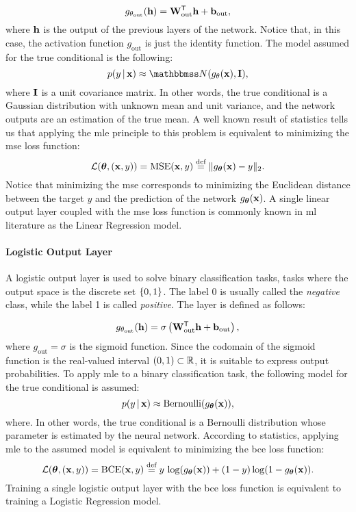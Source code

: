 $$g_{\theta_\mathrm{out}}(\Vector{h}) = \Matrix{W}_{\mathrm{out}}^{\Transpose}\Vector{h} + \Vector{b}_{\mathrm{out}},$$
where $\Vector{h}$ is the output of the previous layers of the network. Notice that, in this case, the activation function $g_{\mathrm{out}}$ is just the identity function. The model assumed for the true conditional is the following:
$$p(y \given \Vector{x}) \approx \Normal{g_{\theta}(\Vector{x})}{\Matrix{I}},$$
where $\Matrix{I}$ is a unit covariance matrix. In other words, the true conditional is a Gaussian distribution with unknown mean and unit variance, and the network outputs are an estimation of the true mean. A well known result of statistics tells us that applying the \gls{mle} principle to this problem is equivalent to minimizing the \gls{mse} loss function:
$$\Loss(\Param, (\Vector{x}, y)) =\Fun{MSE}(\Vector{x}, y) \defeq \norm{g_{\Param}(\Vector{x}) - y}_2.$$
Notice that minimizing the \gls{mse} corresponds to minimizing the Euclidean distance between the target $y$ and the prediction of the network $g_{\Param}(\Vector{x})$.
A single linear output layer coupled with the \gls{mse} loss function is commonly known in \gls{ml} literature as the Linear Regression model.

\paragraph{Logistic Output Layer}
A logistic output layer is used to solve binary classification tasks, \ie tasks where the output space is the discrete set $\{ 0, 1 \}$. The label 0 is usually called the \emph{negative} class, while the label 1 is called \emph{positive}. The layer is defined as follows:

$$g_{\theta_\mathrm{out}}(\Vector{h}) = \sigma \Paren{\Matrix{W}_{\mathrm{out}}^{\Transpose}\Vector{h} + \Vector{b}_{\mathrm{out}}},$$
where $g_{\mathrm{out}} = \sigma$ is the sigmoid  function.
Since the codomain of the sigmoid function is the real-valued interval $(0, 1) \subset \mathbb{R}$, it is suitable to express output probabilities. To apply \gls{mle} to a binary classification task, the following model for the true conditional is assumed:
$$p(y \given \Vector{x}) \approx \Fun{Bernoulli}(g_{\Param}(\Vector{x})),$$
where. In other words, the true conditional is a Bernoulli distribution whose parameter is estimated by the neural network. According to statistics, applying \gls{mle} to the assumed model is equivalent to minimizing the \gls{bce} loss function:
$$\Loss(\Param, (\Vector{x}, y)) = \Fun{BCE}(\Vector{x},y) \defeq y\, \log(g_{\Param}(\Vector{x})) + ( 1 - y) \log(1 - g_{\Param}(\Vector{x})).$$
Training a single logistic output layer with the \gls{bce} loss function is equivalent to training a Logistic Regression model.

